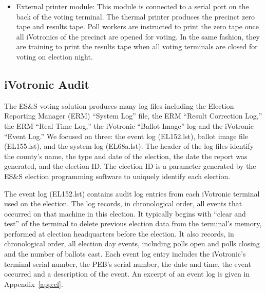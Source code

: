 \begin{itemize}
\item External printer module: This module is connected to a serial port on the back of the voting terminal. The thermal printer produces the precinct zero tape and results tape. Poll workers are instructed to print the zero tape once all iVotronics of the precinct are opened for voting. In the same fashion, they are training to print the results tape when all voting terminals are closed for voting on election night.
\end{itemize}

\subsection{iVotronic Audit}
The ES\&S voting solution produces many log files including the Election Reporting Manager (ERM) \textquotedblleft System Log\textquotedblright \hspace{1 mm} file, the ERM \textquotedblleft Result Correction Log,\textquotedblright \hspace{1 mm} the ERM \textquotedblleft Real Time Log,\textquotedblright \hspace{1 mm} the iVotronic \textquotedblleft Ballot Image\textquotedblright \hspace{1 mm} log and the iVotronic \textquotedblleft Event Log.\textquotedblright \hspace{2 mm} We focused on three: the event log (EL152.lst), ballot image file (EL155.lst), and the system log (EL68a.lst).  The header of the log files identify the county's name, the type and date of the election, the date the report was generated, and the election ID. The election ID is a parameter generated by the ES\&S election programming software to uniquely identify each election. 
 
The event log (EL152.lst) contains audit log entries from each iVotronic terminal used on the election.  The log  records, in  chronological order, all events that occurred on that machine in this election. It typically begins with \textquotedblleft clear and test\textquotedblright \hspace{1 mm} of the terminal to delete previous election data from the terminal's memory, performed at election headquarters before the election. It also records, in chronological order, all election day events, including polls open and polls closing and the number of ballots cast.  Each event log entry includes the iVotronic's terminal serial number, the PEB's serial number, the date and time, the event occurred and a description of the event. An excerpt of  an event log is given in  Appendix~\ref{app:el}. 
 
